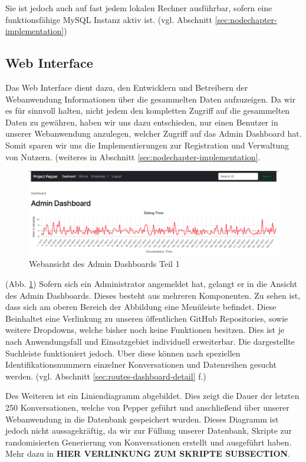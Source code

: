 Sie ist jedoch auch auf fast jedem lokalen Rechner ausführbar, sofern eine funktionsfähige MySQL Instanz aktiv ist.
(vgl. Abschnitt \ref{sec:nodechapter-implementation})

\subsection{Web Interface}
\label{sec:nodechapter-web-interface}
Das Web Interface dient dazu, den Entwicklern und Betreibern der Webanwendung Informationen über die gesammelten Daten
aufzuzeigen. Da wir es für sinnvoll halten, nicht jedem den kompletten Zugriff auf die gesammelten Daten zu gewähren, haben
wir uns dazu entschieden, nur einen Benutzer in unserer Webanwendung anzulegen, welcher Zugriff auf das Admin Dashboard hat.
Somit sparen wir uns die Implementierungen zur Registration und Verwaltung von Nutzern.
(weiteres in Abschnitt \ref{sec:nodechapter-implementation}.\\


\begin{figure}[H]
    \includegraphics[width=\textwidth]{Figures/NodeChapter/adminDashboard1.png}
    \caption{Webansicht des Admin Dashboards Teil 1}
    \label{fig:admindashboard1}
    \centering
\end{figure}

(Abb. \ref{fig:admindashboard1}) Sofern sich ein Administrator angemeldet hat, gelangt er in die Ansicht des Admin Dashboards.
Dieses besteht aus mehreren Komponenten. Zu sehen ist, dass sich am oberen Bereich der Abbildung eine Menüleiste befindet.
Diese Beinhaltet eine Verlinkung zu unseren öffentlichen GitHub Repositories, sowie weitere Dropdowns, welche bisher noch
keine Funktionen besitzen. Dies ist je nach Anwendungsfall und Einsatzgebiet individuell erweiterbar.
Die dargestellte Suchleiste funktioniert jedoch. Uber diese können nach speziellen Identifikationsnummern einzelner Konversationen
und Datenreihen gesucht werden. (vgl. Abschnitt \ref{sec:routes-dashboard-detail} f.)

Des Weiteren ist ein Liniendiagramm abgebildet. Dies zeigt die Dauer der letzten 250 Konversationen, welche von Pepper geführt
und anschließend über unserer Webanwendung in die Datenbank gespeichert wurden. Dieses Diagramm ist jedoch nicht aussagekräftig,
da wir zur Füllung unserer Datenbank, Skripte zur randomisierten Generierung von Konversationen erstellt und ausgeführt haben. Mehr dazu in
\textbf{HIER VERLINKUNG ZUM SKRIPTE SUBSECTION}.

